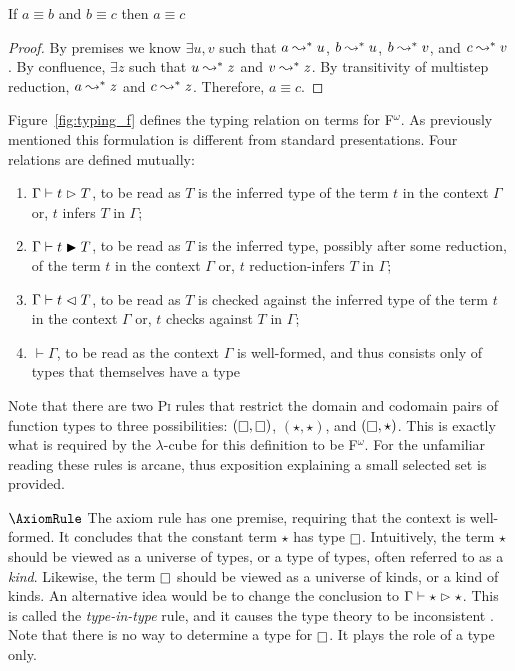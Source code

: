 \begin{theorem}
    If $a \equiv b$ and $b \equiv c$ then $a \equiv c$
    \label{thm:1:trans}
\end{theorem}
\begin{proof}
    By premises we know $\exists u, v$ such that $a \leadsto^* u$, $b \leadsto^* u$, $b \leadsto^* v$, and $c \leadsto^* v$.
    By confluence, $\exists z$ such that $u \leadsto^* z$ and $v \leadsto^* z$.
    By transitivity of multistep reduction, $a \leadsto^* z$ and $c \leadsto^* z$.
    Therefore, $a \equiv c$.
\end{proof}



Figure~\ref{fig:typing_f} defines the typing relation on terms for F$^\omega$.
As previously mentioned this formulation is different from standard presentations.
Four relations are defined mutually:
\begin{enumerate}
    \item $\Gamma \vdash t \vartriangleright T$, to be read as $T$ is the inferred type of the term $t$ in the context $\Gamma$ or, $t$ infers $T$ in $\Gamma$;
    \item $\Gamma \vdash t \blacktriangleright T$, to be read as $T$ is the inferred type, possibly after some reduction, of the term $t$ in the context $\Gamma$ or, $t$ reduction-infers $T$ in $\Gamma$;
    \item $\Gamma \vdash t \vartriangleleft T$, to be read as $T$ is checked against the inferred type of the term $t$ in the context $\Gamma$ or, $t$ checks against $T$ in $\Gamma$;
    \item $\vdash \Gamma$, to be read as the context $\Gamma$ is well-formed, and thus consists only of types that themselves have a type
\end{enumerate}
Note that there are two \textsc{Pi} rules that restrict the domain and codomain pairs of function types to three possibilities: $(\kind, \kind)$, $(\star, \star)$, and $(\kind, \star)$.
This is exactly what is required by the $\lambda$-cube for this definition to be F$^\omega$.
For the unfamiliar reading these rules is arcane, thus exposition explaining a small selected set is provided.

$\AxiomRule$ The axiom rule has one premise, requiring that the context is well-formed.
It concludes that the constant term $\star$ has type $\kind$.
Intuitively, the term $\star$ should be viewed as a universe of types, or a type of types, often referred to as a \textit{kind}.
Likewise, the term $\kind$ should be viewed as a universe of kinds, or a kind of kinds.
An alternative idea would be to change the conclusion to $\Gamma \vdash \star \vartriangleright \star$.
This is called the \textit{type-in-type} rule, and it causes the type theory to be inconsistent \cite{girard1972,hurkens1995}.
Note that there is no way to determine a type for $\kind$.
It plays the role of a type only.

